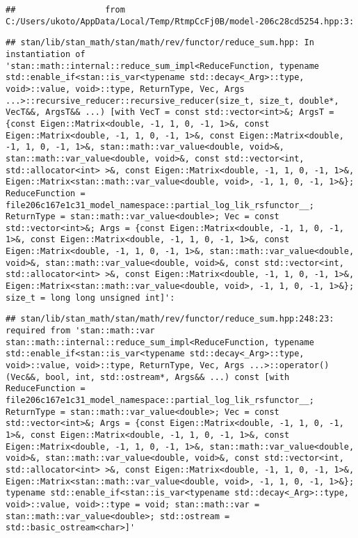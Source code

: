 \documentclass[
]{article}
\begin{document}
\begin{verbatim}
##                  from C:/Users/ukoto/AppData/Local/Temp/RtmpCcFj0B/model-206c28cd5254.hpp:3:
\end{verbatim}

\begin{verbatim}
## stan/lib/stan_math/stan/math/rev/functor/reduce_sum.hpp: In instantiation of 'stan::math::internal::reduce_sum_impl<ReduceFunction, typename std::enable_if<stan::is_var<typename std::decay<_Arg>::type, void>::value, void>::type, ReturnType, Vec, Args ...>::recursive_reducer::recursive_reducer(size_t, size_t, double*, VecT&&, ArgsT&& ...) [with VecT = const std::vector<int>&; ArgsT = {const Eigen::Matrix<double, -1, 1, 0, -1, 1>&, const Eigen::Matrix<double, -1, 1, 0, -1, 1>&, const Eigen::Matrix<double, -1, 1, 0, -1, 1>&, stan::math::var_value<double, void>&, stan::math::var_value<double, void>&, const std::vector<int, std::allocator<int> >&, const Eigen::Matrix<double, -1, 1, 0, -1, 1>&, Eigen::Matrix<stan::math::var_value<double, void>, -1, 1, 0, -1, 1>&}; ReduceFunction = file206c167e1c31_model_namespace::partial_log_lik_rsfunctor__; ReturnType = stan::math::var_value<double>; Vec = const std::vector<int>&; Args = {const Eigen::Matrix<double, -1, 1, 0, -1, 1>&, const Eigen::Matrix<double, -1, 1, 0, -1, 1>&, const Eigen::Matrix<double, -1, 1, 0, -1, 1>&, stan::math::var_value<double, void>&, stan::math::var_value<double, void>&, const std::vector<int, std::allocator<int> >&, const Eigen::Matrix<double, -1, 1, 0, -1, 1>&, Eigen::Matrix<stan::math::var_value<double, void>, -1, 1, 0, -1, 1>&}; size_t = long long unsigned int]':
\end{verbatim}

\begin{verbatim}
## stan/lib/stan_math/stan/math/rev/functor/reduce_sum.hpp:248:23:   required from 'stan::math::var stan::math::internal::reduce_sum_impl<ReduceFunction, typename std::enable_if<stan::is_var<typename std::decay<_Arg>::type, void>::value, void>::type, ReturnType, Vec, Args ...>::operator()(Vec&&, bool, int, std::ostream*, Args&& ...) const [with ReduceFunction = file206c167e1c31_model_namespace::partial_log_lik_rsfunctor__; ReturnType = stan::math::var_value<double>; Vec = const std::vector<int>&; Args = {const Eigen::Matrix<double, -1, 1, 0, -1, 1>&, const Eigen::Matrix<double, -1, 1, 0, -1, 1>&, const Eigen::Matrix<double, -1, 1, 0, -1, 1>&, stan::math::var_value<double, void>&, stan::math::var_value<double, void>&, const std::vector<int, std::allocator<int> >&, const Eigen::Matrix<double, -1, 1, 0, -1, 1>&, Eigen::Matrix<stan::math::var_value<double, void>, -1, 1, 0, -1, 1>&}; typename std::enable_if<stan::is_var<typename std::decay<_Arg>::type, void>::value, void>::type = void; stan::math::var = stan::math::var_value<double>; std::ostream = std::basic_ostream<char>]'
\end{verbatim}
\end{document}

